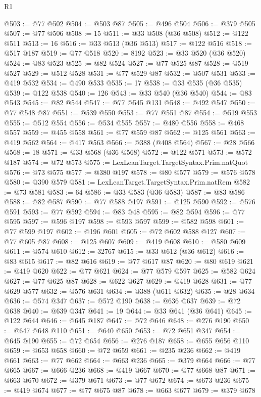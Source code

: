\begin{lexlean}{R1}
\begin{coremodule}
@503 := @77 @502
@504 := @503 @87
@505 := @496 @504
@506 := @379 @505
@507 := @77 @506
@508 := 15
@511 := @33 @508 (@36 @508)
@512 := @122 @511
@513 := 16
@516 := @33 @513 (@36 @513)
@517 := @122 @516
@518 := @517 @187
@519 := @77 @518
@520 := 8192
@523 := @33 @520 (@36 @520)
@524 := @83 @523
@525 := @82 @524
@527 := @77 @525 @87
@528 := @519 @527
@529 := @512 @528
@531 := @77 @529 @87
@532 := @507 @531
@533 := @419 @532
@534 := @490 @533
@535 := 17
@538 := @33 @535 (@36 @535)
@539 := @122 @538
@540 := 126
@543 := @33 @540 (@36 @540)
@544 := @83 @543
@545 := @82 @544
@547 := @77 @545 @131
@548 := @492 @547
@550 := @77 @548 @87
@551 := @539 @550
@553 := @77 @551 @87
@554 := @519 @553
@555 := @512 @554
@556 := @534 @555
@557 := @480 @556
@558 := @468 @557
@559 := @455 @558
@561 := @77 @559 @87
@562 := @125 @561
@563 := @419 @562
@564 := @417 @563
@566 := @388 (@408 @564)
@567 := @28 @566
@568 := 18
@571 := @33 @568 (@36 @568)
@572 := @122 @571
@573 := @572 @187
@574 := @72 @573
@575 := LexLeanTarget.TargetSyntax.Prim.natQuot
@576 := @73 @575
@577 := @380 @197
@578 := @80 @577
@579 := @576 @578
@580 := @390 @579
@581 := LexLeanTarget.TargetSyntax.Prim.natRem
@582 := @73 @581
@583 := 64
@586 := @33 @583 (@36 @583)
@587 := @83 @586
@588 := @82 @587
@590 := @77 @588 @197
@591 := @125 @590
@592 := @576 @591
@593 := @77 @592
@594 := @83 @48
@595 := @82 @594
@596 := @77 @595
@597 := @596 @197
@598 := @593 @597
@599 := @582 @598
@601 := @77 @599 @197
@602 := @196 @601
@605 := @72 @602 @588 @127
@607 := @77 @605 @87
@608 := @125 @607
@609 := @419 @608
@610 := @580 @609
@611 := @574 @610
@612 := 32767
@615 := @33 @612 (@36 @612)
@616 := @83 @615
@617 := @82 @616
@619 := @77 @617 @87
@620 := @80 @619
@621 := @419 @620
@622 := @77 @621
@624 := @77 @579 @597
@625 := @582 @624
@627 := @77 @625 @87
@628 := @622 @627
@629 := @419 @628
@631 := @77 @629 @577
@632 := @576 @631
@634 := @388 (@611 @632)
@635 := @28 @634
@636 := @574 @347
@637 := @572 @190
@638 := @636 @637
@639 := @72 @638
@640 := @639 @347
@641 := 19
@644 := @33 @641 (@36 @641)
@645 := @122 @644
@646 := @645 @187
@647 := @72 @646
@648 := @276 @190
@650 := @647 @648 @110
@651 := @640 @650
@653 := @72 @651 @347
@654 := @645 @190
@655 := @72 @654
@656 := @276 @187
@658 := @655 @656 @110
@659 := @653 @658
@660 := @72 @659
@661 := @235 @236
@662 := @419 @661
@663 := @77 @662
@664 := @663 @236
@665 := @379 @664
@666 := @77 @665
@667 := @666 @236
@668 := @419 @667
@670 := @77 @668 @87
@671 := @663 @670
@672 := @379 @671
@673 := @77 @672
@674 := @673 @236
@675 := @419 @674
@677 := @77 @675 @87
@678 := @663 @677
@679 := @379 @678

\end{coremodule}
\end{lexlean}

